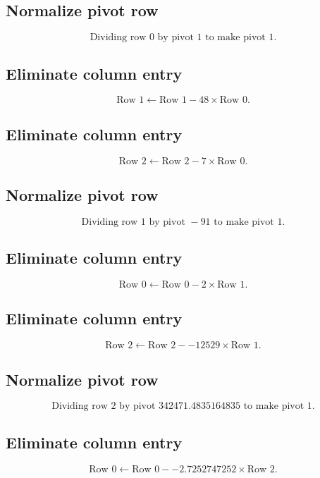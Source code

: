 \documentclass{article}
\begin{document}
\subsection*{ \vspace{1em} Normalize pivot row}
\[
\text{Dividing row } 0 \text{ by pivot } 1 \text{ to make pivot } 1.
\]
\subsection*{ \vspace{1em} Eliminate column entry}
\[
\text{Row } 1 \leftarrow \text{Row }1 - 48 \times \text{Row } 0.
\]
\subsection*{ \vspace{1em} Eliminate column entry}
\[
\text{Row } 2 \leftarrow \text{Row }2 - 7 \times \text{Row } 0.
\]
\subsection*{ \vspace{1em} Normalize pivot row}
\[
\text{Dividing row } 1 \text{ by pivot } -91 \text{ to make pivot } 1.
\]
\subsection*{ \vspace{1em} Eliminate column entry}
\[
\text{Row } 0 \leftarrow \text{Row }0 - 2 \times \text{Row } 1.
\]
\subsection*{ \vspace{1em} Eliminate column entry}
\[
\text{Row } 2 \leftarrow \text{Row }2 - -12529 \times \text{Row } 1.
\]
\subsection*{ \vspace{1em} Normalize pivot row}
\[
\text{Dividing row } 2 \text{ by pivot } 342471.4835164835 \text{ to make pivot } 1.
\]
\subsection*{ \vspace{1em} Eliminate column entry}
\[
\text{Row } 0 \leftarrow \text{Row }0 - -2.7252747252 \times \text{Row } 2.
\]
\end{document}
